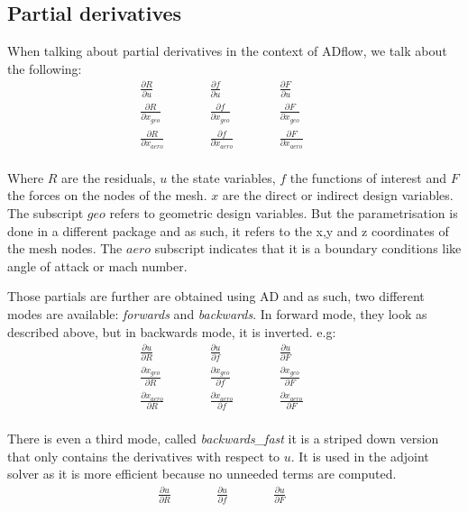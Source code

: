 \subsection{Partial derivatives}
When talking about partial derivatives in the context of ADflow, we talk about
the following:
\begin{align}
    &\frac{\partial R}{\partial u}& \qquad 
    &\frac{\partial f}{\partial u}& \qquad
    &\frac{\partial F}{\partial u}& \qquad \\
%
    &\frac{\partial R}{\partial x_{geo}}& \qquad  
    &\frac{\partial f}{\partial x_{geo}}& \qquad
    &\frac{\partial F}{\partial x_{geo}}&\qquad \\
%
    &\frac{\partial R}{\partial x_{aero}}& \qquad  
    &\frac{\partial f}{\partial x_{aero}}& \qquad
    &\frac{\partial F}{\partial x_{aero}}& \qquad \\
\end{align}

\noindent Where $R$ are the residuals, $u$ the state variables, $f$ the
functions of interest and $F$ the forces on the nodes of the mesh. $x$ are the
direct or indirect design variables. The subscript $geo$ refers to geometric
design variables. But the parametrisation is done in a different package and as
such, it refers to the x,y and z coordinates of the mesh nodes. The $aero$
subscript indicates that it is a boundary conditions like angle of attack or
mach number.


Those partials are further are obtained using AD and as such, two different
modes are available: \textit{forwards} and \textit{backwards}. In forward
mode, they look as described above, but in backwards mode, it is
inverted. e.g:
\begin{align}
    &\frac{\partial u}{\partial R}& \qquad 
    &\frac{\partial u}{\partial f}& \qquad
    &\frac{\partial u}{\partial F}& \qquad \\
%
    &\frac{\partial x_{geo}}{\partial R}& \qquad  
    &\frac{\partial x_{geo}}{\partial f}& \qquad
    &\frac{\partial x_{geo}}{\partial F}&\qquad \\
%
    &\frac{\partial x_{aero}}{\partial R}& \qquad  
    &\frac{\partial x_{aero}}{\partial f}& \qquad
    &\frac{\partial x_{aero}}{\partial F}& \qquad \\
\end{align}

\noindent There is even a third mode, called \textit{backwards\_fast} it is a
striped down version that only contains the derivatives with respect to $u$. It
is used in the adjoint solver as it is more efficient because no unneeded 
terms are computed.
\begin{align}
    &\frac{\partial u}{\partial R}& \qquad 
    &\frac{\partial u}{\partial f}& \qquad
    &\frac{\partial u}{\partial F}& \qquad \\
\end{align}

